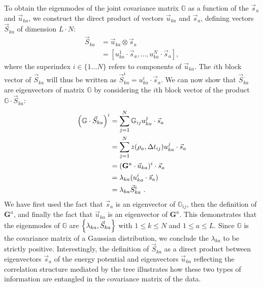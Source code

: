 \documentclass[preprint,amsmath,amssymb,superscriptaddress,showpacs,pre]{revtex4-1}
\let\originalleft\left
\let\originalright\right
\renewcommand{\left}{\mathopen{}\mathclose\bgroup\originalleft}
\renewcommand{\right}{\aftergroup\egroup\originalright}
\newcommand{\vsa}{\vec{s}_a}
\newcommand{\vuka}{\vec{u}_{ka}}
\begin{document}
To obtain the eigenmodes of the joint covariance matrix $\mathbb{G}$ as a function of the $\vsa$ and $\vuka$, we construct the direct product of vectors $\vuka$ and $\vsa$, defining vectors $\vec{S}_{ka}$ of dimension $L\cdot N$:
\begin{equation}
	\begin{split}
		\vec{S}_{ka} &= \vuka \otimes \vsa \\
		&= [u_{ka}^1\cdot\vsa, \ldots, u_{ka}^N\cdot\vsa],
	\end{split}
	\label{eq:Sdef}
\end{equation}
where the superindex $i\in\{1\ldots N\}$ refers to components of $\vuka$.
The $i$th block vector of $\vec{S}_{ka}$ will thus be written as $\vec{S}_{ka}^i = u_{ka}^i\cdot\vsa$. 
We can now show that $\vec{S}_{ka}$ are eigenvectors of matrix $\mathbb{G}$ by considering the $i$th block vector of the product $\mathbb{G}\cdot\vec{S}_{ka}$:
\begin{equation}
	\begin{split}
		\left(\mathbb{G}\cdot\vec{S}_{ka}\right)^i &= \sum_{j=1}^N \mathbb{G}_{ij} u_{ka}^j\cdot\vsa \\
		&= \sum_{j=1}^N z(\rho_a, \Delta t_{ij}) u_{ka}^j\cdot \vsa \\
		&= (\mathbf{G}^a\cdot\vuka)^i \cdot \vsa\\
		&= \lambda_{ka}(u_{ka}^i\cdot\vsa) \\
		&= \lambda_{ka}\vec{S}_{ka}^i \ .
	\end{split}
\end{equation}
We have first used the fact that $\vsa$ is an eigenvector of $\mathbb{G}_{ij}$, then the definition of ${\bm G}^a$, and finally the fact that $\vuka$ is an eigenvector of ${\bm G}^a$. 
This demonstrates that the eigenmodes of $\mathbb{G}$ are $\left\{ \lambda_{ka}, \vec{S}_{ka} \right\}$ with $1\leq k\leq N$ and $1\leq a \leq L$. 
Since $\mathbb{G}$ is the covariance matrix of a Gaussian distribution, we conclude the $\lambda_{ka}$ to be strictly positive.
Interestingly, the definition of $\vec{S}_{ka}$ as a direct product between eigenvectors $\vsa$ of the energy potential and eigenvectors $\vuka$ reflecting the correlation structure mediated by the tree illustrates how these two types of information are entangled in the covariance matrix of the data.
\end{document}

